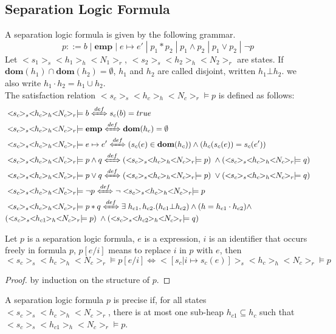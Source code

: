 \documentclass{lmcs} %
\theoremstyle{plain}\newtheorem{satz}[thm]{Satz} %
\begin{document}
\subsection*{Separation Logic Formula} A separation logic formula\cite{reynolds2002separation}\cite{o2019separation} is given by the following grammar.
$$p::=b\;|\;\mathbf{emp}\;|\;e\mapsto e'\;|\;p_1*p_2\;|\;p_1\wedge p_2\;|\;p_1\vee p_2\;|\;\neg p$$
Let $<\!\!s_1\!\!>_s<\!\!h_1\!\!>_h<\!\!N_1\!\!>_r$, $<\!\!s_2\!\!>_s<\!\!h_2\!\!>_h<\!\!N_2\!\!>_r$ are states.
If $\mathbf{dom}(h_1)\cap \mathbf{dom}(h_2)=\emptyset$, $h_1$ and $h_2$ are called disjoint, written $h_1\bot h_2$. we also write $h_1\cdot h_2=h_1 \cup h_2$.\\
The satisfaction relation $<\!\!s_c\!\!>_s<\!\!h_c\!\!>_h<\!\!N_c\!\!>_r\models p$ is defined as follows:
\begin{align*}
&<\!\!s_{c}\!\!>_s<\!\!h_{c}\!\!>_h<\!\!N_{c}\!\!>_r \models b \xLeftrightarrow{def} s_{c}(b)=true \\
   &<\!\!s_{c}\!\!>_s<\!\!h_{c}\!\!>_h<\!\!N_{c}\!\!>_r \models \mathbf{emp} \xLeftrightarrow{def} \mathbf{dom}(h_{c})=\emptyset \\
   &<\!\!s_{c}\!\!>_s<\!\!h_{c}\!\!>_h<\!\!N_{c}\!\!>_r \models e\mapsto e' \xLeftrightarrow{def} (s_{c}(e)\in\mathbf{dom}(h_{c})) \wedge (h_{c}(s_{c}(e))=s_{c}(e'))\\
   &<\!\!s_c\!\!>_s<\!\!h_{c}\!\!>_h<\!\!N_{c}\!\!>_r \models p\wedge q \xLeftrightarrow{def} (<\!\!s_c\!\!>_s<\!\!h_{c}\!\!>_h<\!\!N_{c}\!\!>_r \models p)\; \wedge (<\!\!s_c\!\!>_s<\!\!h_{c}\!\!>_h<\!\!N_{c}\!\!>_r \models q)\\
   &<\!\!s_c\!\!>_s<\!\!h_{c}\!\!>_h<\!\!N_{c}\!\!>_r \models p\vee q \xLeftrightarrow{def} (<\!\!s_c\!\!>_s<\!\!h_{c}\!\!>_h<\!\!N_{c}\!\!>_r \models p)\; \vee (<\!\!s_c\!\!>_s<\!\!h_{c}\!\!>_h<\!\!N_{c}\!\!>_r \models q)\\
   &<\!\!s_c\!\!>_s<\!\!h_{c}\!\!>_h<\!\!N_{c}\!\!>_r \models \neg p \xLeftrightarrow{def} \neg <\!\!s_c\!\!>_s<\!\!h_{c}\!\!>_h<\!\!N_{c}\!\!>_r \models p\\
   &<\!\!s_c\!\!>_s<\!\!h_{c}\!\!>_h<\!\!N_{c}\!\!>_r \models p*q \xLeftrightarrow{def} \exists\; h_{c1}, h_{c2}. (h_{c1}\bot h_{c2}) \wedge (h=h_{c1}\cdot h_{c2}) \wedge\\
   &(<\!\!s_c\!\!>_s<\!\!h_{c1}\!\!>_h<\!\!N_{c}\!\!>_r \models p)\; \wedge (<\!\!s_c\!\!>_s<\!\!h_{c2}\!\!>_h<\!\!N_{c}\!\!>_r \models q)
\end{align*}
\begin{lem}
Let $p$ is a separation logic formula, $e$ is a expression, $i$ is an identifier that occurs freely in formula $p$, $p[e/i]$ means to replace $i$ in $p$ with $e$, then
$$<\!\!s_c\!\!>_s<\!\!h_{c}\!\!>_h<\!\!N_{c}\!\!>_r\models p[e/i]\Leftrightarrow <\!\![s_c|i\mapsto s_c(e)]\!\!>_s<\!\!h_{c}\!\!>_h<\!\!N_{c}\!\!>_r\models p$$
\end{lem}
\begin{proof}
by induction on the structure of $p$.
\end{proof}
A separation logic formula $p$ is precise\cite{brookes2007semantics} if, for all states $<\!\!s_c\!\!>_s<\!\!h_{c}\!\!>_h<\!\!N_{c}\!\!>_r$, there is at most one sub-heap $h_{c1}\subseteq h_{c}$ such that $<\!\!s_c\!\!>_s<\!\!h_{c1}\!\!>_h<\!\!N_{c}\!\!>_r\models p$.
\end{document}
